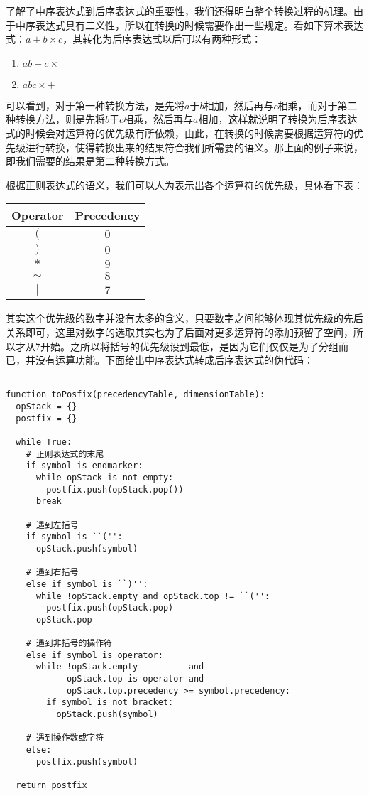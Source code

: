 了解了中序表达式到后序表达式的重要性，我们还得明白整个转换过程的机理。由于中序表达式具有二义性，所以在转换的时候需要作出一些规定。看如下算术表达式：$a + b \times c$，其转化为后序表达式以后可以有两种形式：

\begin{enumerate}
    \item $a b + c \times$
    \item $a b c \times +$
\end{enumerate}

可以看到，对于第一种转换方法，是先将$a$于$b$相加，然后再与$c$相乘，而对于第二种转换方法，则是先将$b$于$c$相乘，然后再与$a$相加，这样就说明了转换为后序表达式的时候会对运算符的优先级有所依赖，由此，在转换的时候需要根据运算符的优先级进行转换，使得转换出来的结果符合我们所需要的语义。那上面的例子来说，即我们需要的结果是第二种转换方式。

根据正则表达式的语义，我们可以人为表示出各个运算符的优先级，具体看下表：

\begin{center}\begin{tabular}{|c|c|}
    \hline
    \bf{Operator} & \bf{Precedency} \\ \hline
    $($      & $0$        \\ \hline
    $)$      & $0$        \\ \hline
    $*$      & $9$        \\ \hline
    $\sim$   & $8$        \\ \hline
    $|$      & $7$        \\ \hline
\end{tabular}\end{center}

其实这个优先级的数字并没有太多的含义，只要数字之间能够体现其优先级的先后关系即可，这里对数字的选取其实也为了后面对更多运算符的添加预留了空间，所以才从7开始。之所以将括号的优先级设到最低，是因为它们仅仅是为了分组而已，并没有运算功能。下面给出中序表达式转成后序表达式的伪代码：

\begin{verbatim}

function toPosfix(precedencyTable, dimensionTable):
  opStack = {}
  postfix = {}

  while True:
    # 正则表达式的末尾
    if symbol is endmarker:
      while opStack is not empty:
        postfix.push(opStack.pop())
      break

    # 遇到左括号
    if symbol is ``('':
      opStack.push(symbol)

    # 遇到右括号
    else if symbol is ``)'':
      while !opStack.empty and opStack.top != ``('':
        postfix.push(opStack.pop)
      opStack.pop

    # 遇到非括号的操作符
    else if symbol is operator:
      while !opStack.empty          and 
            opStack.top is operator and
            opStack.top.precedency >= symbol.precedency:
        if symbol is not bracket:
          opStack.push(symbol)

    # 遇到操作数或字符
    else:
      postfix.push(symbol)

  return postfix

\end{verbatim}

